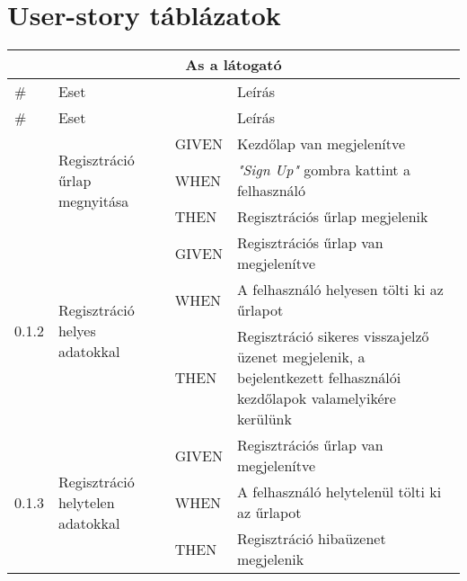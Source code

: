 \section{User-story táblázatok}


\begin{center}
	\begin{longtable}{ | p{} | p{} | p{} | p{} | }
			
			\hline
			\multicolumn{4}{|c|}{\textbf{As a látogató}}
			\\ \hline
			
			\# & Eset & & Leírás
			\\ \hline \hline
			\endfirsthead %
			
			\hline
			\# & Eset & & Leírás
			\\ \hline \hline
			\endhead %
			
			\hline
			\endfoot %
			
			\endlastfoot %
			

			\multirow{3}{*}{0.1.1} 
			& \multirow{3}{=}{Regisztráció űrlap megnyitása} 
			& GIVEN 
			& Kezdőlap van megjelenítve \\
			\cline{3-4}
			& & WHEN 
			& \emph{"Sign Up"} gombra kattint a felhasználó \\
			\cline{3-4}
			& & THEN 
			& Regisztrációs űrlap megjelenik \\
			\hline

			\multirow{3}{*}{0.1.2} 
			& \multirow{3}{=}{Regisztráció helyes adatokkal} 
			& GIVEN 
			& Regisztrációs űrlap van megjelenítve \\
			\cline{3-4}
			& & WHEN 
			& A felhasználó helyesen tölti ki az űrlapot \\
			\cline{3-4}
			& & THEN 
			& Regisztráció sikeres visszajelző üzenet megjelenik, a bejelentkezett felhasználói kezdőlapok valamelyikére kerülünk \\
			\hline

			\multirow{3}{*}{0.1.3} 
			& \multirow{3}{=}{Regisztráció helytelen adatokkal} 
			& GIVEN 
			& Regisztrációs űrlap van megjelenítve \\
			\cline{3-4}
			& & WHEN 
			& A felhasználó helytelenül tölti ki az űrlapot \\
			\cline{3-4}
			& & THEN 
			& Regisztráció hibaüzenet megjelenik \\
			\hline


\end{longtable}
\end{center}
